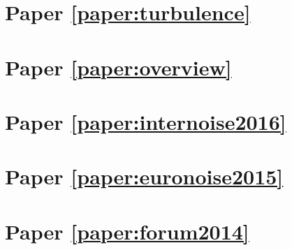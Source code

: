 \documentclass[12pt,a4paper,twoside,openright]{book}
\begin{document}
\chapter*{Paper \ref{paper:turbulence}}

\chapter*{Paper \ref{paper:overview}}

\chapter*{Paper \ref{paper:internoise2016}}

\chapter*{Paper \ref{paper:euronoise2015}}

\chapter*{Paper \ref{paper:forum2014}}

\end{document}
